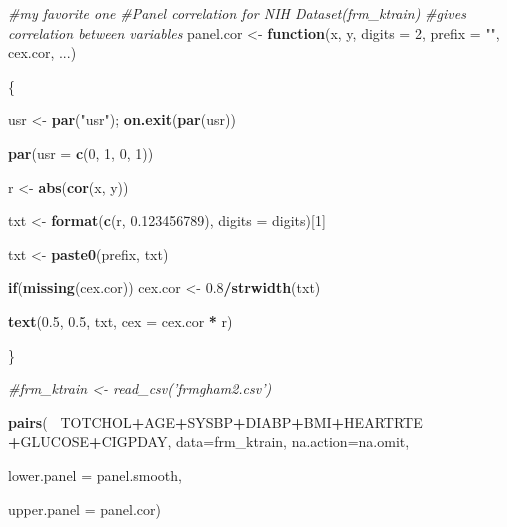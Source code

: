\documentclass[]{article}
\newenvironment{Shaded}{\begin{snugshade}}{\end{snugshade}}
\newcommand{\KeywordTok}[1]{\textcolor[rgb]{0.13,0.29,0.53}{\textbf{#1}}}
\newcommand{\DataTypeTok}[1]{\textcolor[rgb]{0.13,0.29,0.53}{#1}}
\newcommand{\DecValTok}[1]{\textcolor[rgb]{0.00,0.00,0.81}{#1}}
\newcommand{\FloatTok}[1]{\textcolor[rgb]{0.00,0.00,0.81}{#1}}
\newcommand{\StringTok}[1]{\textcolor[rgb]{0.31,0.60,0.02}{#1}}
\newcommand{\CommentTok}[1]{\textcolor[rgb]{0.56,0.35,0.01}{\textit{#1}}}
\newcommand{\ControlFlowTok}[1]{\textcolor[rgb]{0.13,0.29,0.53}{\textbf{#1}}}
\newcommand{\OperatorTok}[1]{\textcolor[rgb]{0.81,0.36,0.00}{\textbf{#1}}}
\newcommand{\NormalTok}[1]{#1}
\begin{document}
\begin{Shaded}
\begin{Highlighting}[]
\CommentTok{#my favorite one}
\CommentTok{#Panel correlation for NIH Dataset(frm_ktrain)}
\CommentTok{#gives correlation between variables}
\NormalTok{panel.cor <-}\StringTok{ }\ControlFlowTok{function}\NormalTok{(x, y, }\DataTypeTok{digits =} \DecValTok{2}\NormalTok{, }\DataTypeTok{prefix =} \StringTok{""}\NormalTok{, cex.cor, ...)}

\NormalTok{\{}

\NormalTok{  usr <-}\StringTok{ }\KeywordTok{par}\NormalTok{(}\StringTok{"usr"}\NormalTok{); }\KeywordTok{on.exit}\NormalTok{(}\KeywordTok{par}\NormalTok{(usr))}

  \KeywordTok{par}\NormalTok{(}\DataTypeTok{usr =} \KeywordTok{c}\NormalTok{(}\DecValTok{0}\NormalTok{, }\DecValTok{1}\NormalTok{, }\DecValTok{0}\NormalTok{, }\DecValTok{1}\NormalTok{))}

\NormalTok{  r <-}\StringTok{ }\KeywordTok{abs}\NormalTok{(}\KeywordTok{cor}\NormalTok{(x, y))}

\NormalTok{  txt <-}\StringTok{ }\KeywordTok{format}\NormalTok{(}\KeywordTok{c}\NormalTok{(r, }\FloatTok{0.123456789}\NormalTok{), }\DataTypeTok{digits =}\NormalTok{ digits)[}\DecValTok{1}\NormalTok{]}

\NormalTok{  txt <-}\StringTok{ }\KeywordTok{paste0}\NormalTok{(prefix, txt)}

  \ControlFlowTok{if}\NormalTok{(}\KeywordTok{missing}\NormalTok{(cex.cor)) cex.cor <-}\StringTok{ }\FloatTok{0.8}\OperatorTok{/}\KeywordTok{strwidth}\NormalTok{(txt)}

  \KeywordTok{text}\NormalTok{(}\FloatTok{0.5}\NormalTok{, }\FloatTok{0.5}\NormalTok{, txt, }\DataTypeTok{cex =}\NormalTok{ cex.cor }\OperatorTok{*}\StringTok{ }\NormalTok{r)}

\NormalTok{\}}


\CommentTok{#frm_ktrain <- read_csv('frmgham2.csv')}

\KeywordTok{pairs}\NormalTok{( }\OperatorTok{~}\NormalTok{TOTCHOL}\OperatorTok{+}\NormalTok{AGE}\OperatorTok{+}\NormalTok{SYSBP}\OperatorTok{+}\NormalTok{DIABP}\OperatorTok{+}\NormalTok{BMI}\OperatorTok{+}\NormalTok{HEARTRTE }\OperatorTok{+}\NormalTok{GLUCOSE}\OperatorTok{+}\NormalTok{CIGPDAY, }\DataTypeTok{data=}\NormalTok{frm_ktrain, }\DataTypeTok{na.action=}\NormalTok{na.omit,}

       \DataTypeTok{lower.panel =}\NormalTok{ panel.smooth,}

       \DataTypeTok{upper.panel =}\NormalTok{ panel.cor)}
\end{Highlighting}
\end{Shaded}
\end{document}
